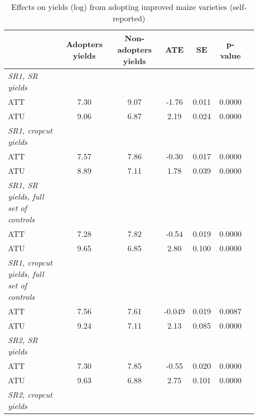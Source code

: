\begin{table}[H]
\centering
\hspace*{-1.2cm}
\begin{threeparttable}
\caption{Effects on yields (log) from adopting improved maize varieties (self-reported)}
\label{tab:switch1}
\begin{tabular}{l cccccc}
\hline
\hline
            &Adopters yields&Non-adopters yields&         ATE&          SE&     p-value\\
\hline
\textit{SR1, SR yields}&            &            &            &            &            \\
ATT         &        7.30&        9.07&       -1.76&       0.011&      0.0000\\
%
%
%
ATU         &        9.06&        6.87&        2.19&       0.024&      0.0000\\
%
%
%
\textit{SR1, cropcut yields}&            &            &            &            &            \\
ATT         &        7.57&        7.86&       -0.30&       0.017&      0.0000\\
%
%
%
ATU         &        8.89&        7.11&        1.78&       0.039&      0.0000\\
%
%
%
\textit{SR1, SR yields, full set of controls}&            &            &            &            &            \\
ATT         &        7.28&        7.82&       -0.54&       0.019&      0.0000\\
%
%
%
ATU         &        9.65&        6.85&        2.80&       0.100&      0.0000\\
%
%
%
\textit{SR1, cropcut yields, full set of controls}&            &            &            &            &            \\
ATT         &        7.56&        7.61&      -0.049&       0.019&      0.0087\\
%
%
%
ATU         &        9.24&        7.11&        2.13&       0.085&      0.0000\\
%
%
%
\textit{SR2, SR yields}&            &            &            &            &            \\
ATT         &        7.30&        7.85&       -0.55&       0.020&      0.0000\\
%
%
%
ATU         &        9.63&        6.88&        2.75&       0.101&      0.0000\\
%
%
%
\textit{SR2, cropcut yields}&            &            &            &            &            \\

\end{tabular}
\end{threeparttable}
\end{table}
